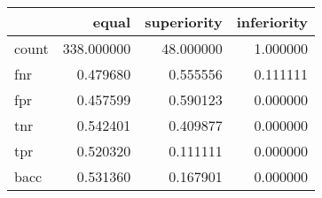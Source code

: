 \begin{tabular}{lrrr}
\toprule
{} &       equal &  superiority &  inferiority \\
\midrule
count &  338.000000 &    48.000000 &     1.000000 \\
fnr   &    0.479680 &     0.555556 &     0.111111 \\
fpr   &    0.457599 &     0.590123 &     0.000000 \\
tnr   &    0.542401 &     0.409877 &     0.000000 \\
tpr   &    0.520320 &     0.111111 &     0.000000 \\
bacc  &    0.531360 &     0.167901 &     0.000000 \\
\bottomrule
\end{tabular}
